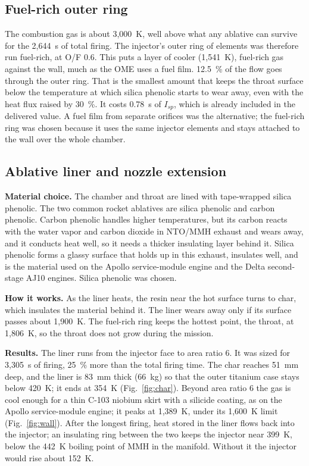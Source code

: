 \documentclass[10pt]{article}
\newcommand{\Ntb}{2{,}644}
\newcommand{\NBZpct}{12.5}
\newcommand{\NBZOF}{0.6}
\newcommand{\NBZTc}{1{,}541}
\newcommand{\NBZloss}{0.78}
\newcommand{\Nliner}{83}
\newcommand{\NlinerMass}{66}
\newcommand{\Nchar}{51}
\newcommand{\Ntdesign}{3{,}305}
\newcommand{\Nepsatt}{6}
\newcommand{\NTmaxExt}{1{,}389}
\newcommand{\NTthroat}{1{,}806}
\newcommand{\NTback}{354}
\newcommand{\NTinj}{399}
\newcommand{\NdTinjZero}{152}
\begin{document}
\subsection{Fuel-rich outer ring}
The combustion gas is about 3,000~K, well above what any ablative can survive for the \Ntb~s of total firing. The
injector's outer ring of elements was therefore run fuel-rich, at O/F \NBZOF{}. This puts a layer of cooler
(\NBZTc~K), fuel-rich gas against the wall, much as the OME uses a fuel film. \NBZpct~\% of the flow goes through the
outer ring. That is the smallest amount that keeps the throat surface below the temperature at which silica phenolic
starts to wear away, even with the heat flux raised by 30~\%. It costs \NBZloss~s of $I_{sp}$, which is already
included in the delivered value. A fuel film from separate orifices was the alternative; the fuel-rich ring was chosen
because it uses the same injector elements and stays attached to the wall over the whole chamber.

\subsection{Ablative liner and nozzle extension}
\textbf{Material choice.} The chamber and throat are lined with tape-wrapped silica phenolic. The two common rocket
ablatives are silica phenolic and carbon phenolic. Carbon phenolic handles higher temperatures, but its carbon reacts
with the water vapor and carbon dioxide in NTO/MMH exhaust and wears away, and it conducts heat well, so it needs a
thicker insulating layer behind it. Silica phenolic forms a glassy surface that holds up in this exhaust, insulates
well, and is the material used on the Apollo service-module engine and the Delta second-stage AJ10 engines. Silica
phenolic was chosen.

\textbf{How it works.} As the liner heats, the resin near the hot surface turns to char, which insulates the material
behind it. The liner wears away only if its surface passes about 1,900~K. The fuel-rich ring keeps the hottest point,
the throat, at \NTthroat~K, so the throat does not grow during the mission.

\textbf{Results.} The liner runs from the injector face to area ratio \Nepsatt{}. It was sized for \Ntdesign~s of
firing, 25~\% more than the total firing time. The char reaches \Nchar~mm deep, and the liner is \Nliner~mm thick
(\NlinerMass~kg) so that the outer titanium case stays below 420~K; it ends at \NTback~K (Fig.~\ref{fig:char}). Beyond
area ratio \Nepsatt{} the gas is cool enough for a thin C-103 niobium skirt with a silicide coating, as on the Apollo
service-module engine; it peaks at \NTmaxExt~K, under its 1,600~K limit (Fig.~\ref{fig:wall}). After the longest firing,
heat stored in the liner flows back into the injector; an insulating ring between the two keeps the injector near
\NTinj~K, below the 442~K boiling point of MMH in the manifold. Without it the injector would rise about \NdTinjZero~K.
\end{document}
